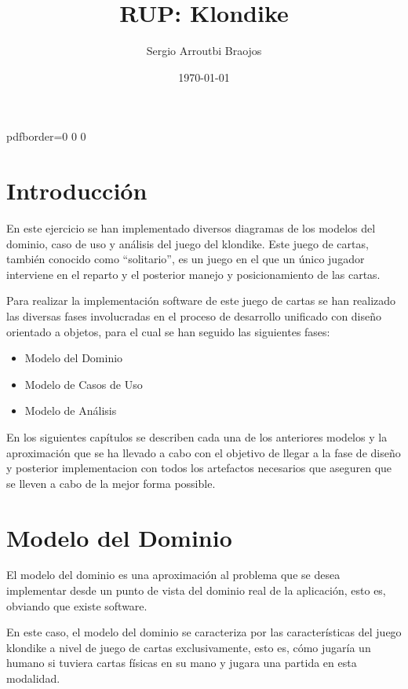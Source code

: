 \documentclass[11pt]{article}
\title{\textbf{RUP: Klondike}}
\author{Sergio Arroutbi Braojos}
\date{\today}
\begin{document}
\hypersetup
{   
pdfborder={0 0 0}
}
   
\maketitle

\pagebreak

\tableofcontents

\pagebreak

\section{Introducción}
En este ejercicio se han implementado diversos diagramas de los modelos del dominio, caso de uso y análisis del juego del klondike. Este juego de cartas, también conocido como ``solitario'', es un juego en el que un único jugador interviene en el reparto y el posterior manejo y posicionamiento de las cartas.

Para realizar la implementación software de este juego de cartas se han realizado las diversas fases involucradas en el proceso de desarrollo unificado con diseño orientado a objetos, para el cual se han seguido las siguientes fases:

\begin{itemize}\itemsep0pt
\item{Modelo del Dominio}
\item{Modelo de Casos de Uso}
\item{Modelo de Análisis}
\end{itemize}

En los siguientes capítulos se describen cada una de los anteriores modelos y la aproximación que se ha llevado a cabo con el objetivo de llegar a la fase de diseño y posterior implementacion con todos los artefactos necesarios que aseguren que se lleven a cabo de la mejor forma possible.

\pagebreak

\section{Modelo del Dominio}

El modelo del dominio es una aproximación al problema que se desea implementar desde un punto de vista del dominio real de la aplicación, esto es, obviando que existe software.

En este caso, el modelo del dominio se caracteriza por las características del juego klondike a nivel de juego de cartas exclusivamente, esto es, cómo jugaría un humano si tuviera cartas físicas en su mano y jugara una partida en esta modalidad. 
\end{document}
